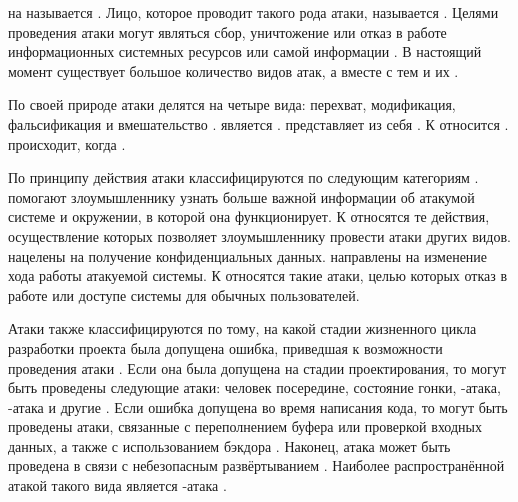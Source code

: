 %
 на  называется  .
%
Лицо, которое проводит такого рода атаки, называется  . 
%
Целями проведения атаки могут являться сбор, уничтожение или отказ в работе информационных системных ресурсов или самой информации . 
%
В настоящий момент существует большое количество видов атак, а вместе с тем и их .

%
По своей природе атаки делятся на четыре вида: перехват, модификация, фальсификация и вмешательство . 
%
 является .
%
 представляет из себя .
%
К  относится .
%
 происходит, когда .

%
По принципу действия атаки классифицируются по следующим категориям .
%
 помогают злоумышленнику узнать больше важной информации об атакумой системе и окружении, в которой она функционирует.
%
К  относятся те действия, осуществление которых позволяет злоумышленнику провести атаки других видов. 
%
 нацелены на получение конфиденциальных данных. 
%
 направлены на изменение хода работы атакуемой системы. 
%
К  относятся такие атаки, целью которых отказ в работе или доступе системы для обычных пользователей. 

%
Атаки также классифицируются по тому, на какой стадии жизненного цикла разработки проекта была допущена ошибка, приведшая к возможности проведения атаки .
%
Если она была допущена на стадии проектирования, то могут быть проведены следующие атаки: человек посередине, состояние гонки, -атака, -атака и другие .
%
Если ошибка допущена во время написания кода, то могут быть проведены атаки, связанные с переполнением буфера или проверкой входных данных, а также с использованием бэкдора .
%
Наконец, атака может быть проведена в связи с небезопасным развёртыванием . 
%
Наиболее распространённой атакой такого вида является -атака 
. 

